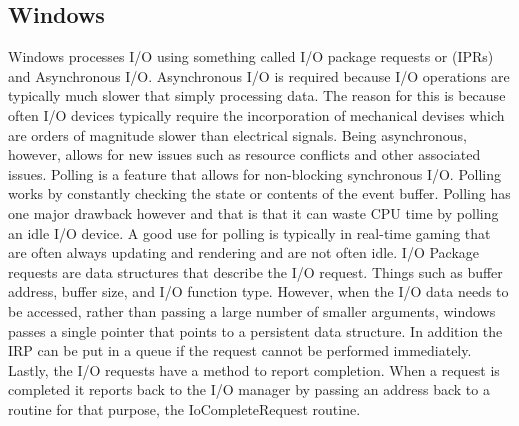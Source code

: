 \documentclass[a4paper,10pt,onecolumn]{article}
\begin{document}
\subsection{Windows}
Windows processes I/O using something called I/O package requests or (IPRs) and Asynchronous I/O.
Asynchronous I/O is required because I/O operations are typically much slower that simply processing data. The reason for this is because often I/O devices typically require the incorporation of mechanical devises which are orders of magnitude slower than electrical signals. 
Being asynchronous, however, allows for new issues such as resource conflicts and other associated issues.
\newline
\newline
Polling is a feature that allows for non-blocking synchronous I/O. Polling works by constantly checking the state or contents of the event buffer. Polling has one major drawback however and that is that it can waste CPU time by polling an idle I/O device. A good use for polling is typically in real-time gaming that are often always updating and rendering and are not often idle.
\newline
\newline
I/O Package requests are data structures that describe the I/O request. Things such as buffer address, buffer size, and I/O function type. However, when the I/O data needs to be accessed, rather than passing a large number of smaller arguments, windows passes a single pointer that points to a persistent data structure. In addition the IRP can be put in a queue if the request cannot be performed immediately. Lastly, the I/O requests have a method to report completion. When a request is completed it reports back to the I/O manager by passing an address back to a routine for that purpose, the IoCompleteRequest routine.
\newpage
\end{document}

